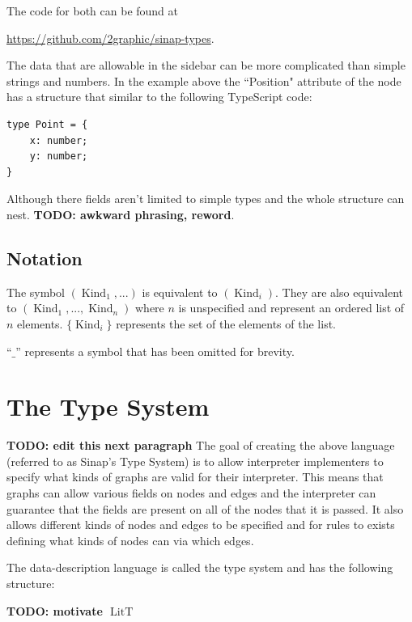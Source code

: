 \documentclass{article}
\DeclareMathOperator{\LitT}{LitT}
\begin{document}
The code for both can be found at 

\href{https://github.com/2graphic/sinap-types}
{https://github.com/2graphic/sinap-types}.

The data that are allowable in the sidebar can be more complicated than
simple strings and numbers. In the example above the ``Position" attribute
of the node has a structure that similar to the following TypeScript code:

\begin{samepage}
\begin{verbatim}
type Point = {
    x: number;
    y: number;
}
\end{verbatim}
\end{samepage}

Although there fields aren't limited to simple types and the 
whole structure can nest. \textbf{TODO: awkward phrasing, reword}. 

\subsection{Notation}
The symbol \((\operatorname{Kind}_1, ...)\) is equivalent to 
\((\operatorname{Kind}_i)\). They are also equivalent to 
\((\operatorname{Kind}_1, ..., \operatorname{Kind}_n)\)
where \(n\) is unspecified and represent an ordered list 
of \(n\) elements. \(\{\operatorname{Kind}_i\}\) represents 
the set of the elements of the list. 

``\(\_\)'' represents a symbol that has been omitted for brevity.

\section{The Type System}

\textbf{TODO: edit this next paragraph}
The goal of creating the above language (referred to as Sinap's 
Type System) is to allow interpreter implementers to specify what 
kinds of graphs are valid for their interpreter. This means that 
graphs can allow various fields on nodes and edges and the interpreter
can guarantee that the fields are present on all of the nodes that it
is passed. It also allows different kinds of nodes and edges to be 
specified and for rules to exists defining what kinds of nodes can 
via which edges. 


The data-description language is called the type system and has 
the following structure:

\textbf{TODO: motivate \(\LitT\)}
\end{document}
